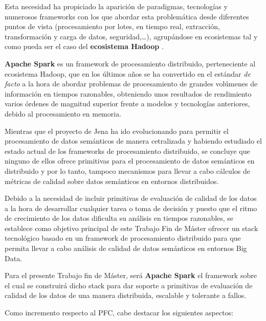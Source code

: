 Esta necesidad ha propiciado la aparición de paradigmas, tecnologías y numerosos
frameworks con los que abordar esta problemática desde diferentes puntos de
vista (procesamiento por lotes, en tiempo real, extracción, transformación y
carga de datos, seguridad,\ldots), agrupándose en ecosistemas tal y como pueda
ser el caso del \textbf{ecosistema Hadoop} \cite{HADOOP-ecosystem}.

\textbf{Apache Spark} \cite{SPARK} es un framework de procesamiento distribuido,
perteneciente al ecosistema Hadoop, que en los últimos años se ha convertido en
el estándar \textit{de facto} a la hora de abordar problemas de procesamiento de
grandes volúmenes de información en tiempos razonables, obteniendo unos
resultados de rendimiento varios órdenes de magnitud superior frente a modelos y
tecnologías anteriores, debido al procesamiento en memoria.

Mientras que el proyecto de Jena ha ido evolucionando para permitir el
procesamiento de datos semánticos de manera cetralizada y habiendo estudiado el
estado actual de los frameworks de procesamiento distribuido, se concluye que
ninguno de ellos ofrece primitivas para el procesamiento de datos semánticos en
distribuido y por lo tanto, tampoco mecanismos para llevar a cabo cálculos de
métricas de calidad sobre datos semánticos en entornos distribuidos.

Debido a la necesidad de incluir primitivas de evaluación de calidad de los
datos a la hora de desarrollar cualquier tarea o toma de decisión y puesto que
el ritmo de crecimiento de los datos dificulta su análisis en tiempos
razonables, se establece como objetivo principal de este Trabajo Fin de Máster
ofrecer un stack tecnológico basado en un framework de procesamiento distribuido
para que permita llevar a cabo análisis de calidad de datos semánticos en
entornos Big Data.

Para el presente Trabajo fin de Máster, será \textbf{Apache Spark} el framework
sobre el cual se construirá dicho stack para dar soporte a primitivas de
evaluación de calidad de los datos de una manera distribuida, escalable y
tolerante a fallos.

Como incremento respecto al \acf{PFC}, cabe destacar los siguientes aspectos:

